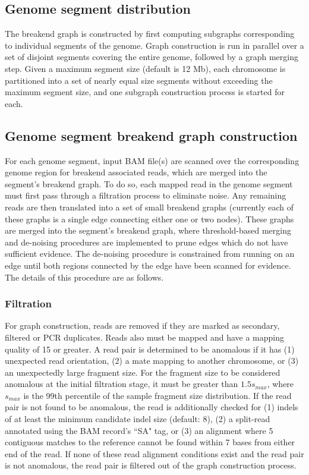 \documentclass{article}
\begin{document}
\subsection{Genome segment distribution}

The breakend graph is constructed by first computing subgraphs corresponding to individual segments of the genome. Graph construction is run in parallel over a set of disjoint segments covering the entire genome, followed by a graph merging step. Given a maximum segment size (default is 12 Mb), each chromosome is partitioned into a set of nearly equal size segments without exceeding the maximum segment size, and one subgraph construction process is started for each.

\subsection{Genome segment breakend graph construction}

For each genome segment, input BAM file(s) are scanned over the corresponding genome region for breakend associated reads, which are merged into the segment's breakend graph. To do so, each mapped read in the genome segment must first pass through a filtration process to eliminate noise. Any remaining reads are then translated into a set of small breakend graphs (currently each of these graphs is a single edge connecting either one or two nodes). These graphs are merged into the segment's breakend graph, where threshold-based merging and de-noising procedures are implemented to prune edges which do not have sufficient evidence. The de-noising procedure is constrained from running on an edge until both regions connected by the edge have been scanned for evidence. The details of this procedure are as follows.

\subsubsection{Filtration}
For graph construction, reads are removed if they are marked as secondary, filtered or PCR duplicates. Reads also must be mapped and have a mapping quality of 15 or greater. A read pair is determined to be anomalous if it has (1) unexpected read orientation, (2) a mate mapping to another chromosome, or (3) an unexpectedly large fragment size. For the fragment size to be considered anomalous at the initial filtration stage, it must be greater than $1.5s_{max}$, where $s_{max}$ is the 99th percentile of the sample fragment size distribution. If the read pair is not found to be anomalous, the read is additionally checked for (1) indels of at least the minimum candidate indel size (default: 8), (2) a split-read annotated using the BAM record's ``SA" tag, or (3) an alignment where 5 contiguous matches to the reference cannot be found within 7 bases from either end of the read. If none of these read alignment conditions exist and the read pair is not anomalous, the read pair is filtered out of the graph construction process.
\end{document}
